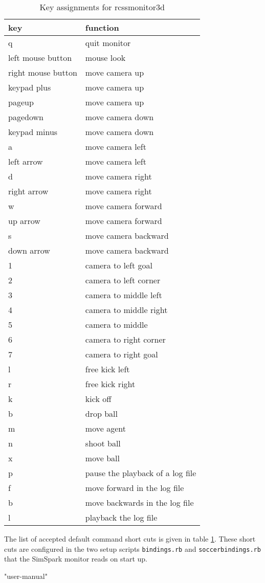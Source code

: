 \begin{table}
\label {table:rcssmonitor3d}
\caption{Key assignments for rcssmonitor3d}
\begin{center}
\begin{tabular}{|l|l|}
{\bf key} & {\bf function} \\
\hline
q & quit monitor \\
\hline
left mouse button & mouse look \\
right mouse button & move camera up \\
keypad plus & move camera up \\
pageup & move camera up \\
pagedown & move camera down \\
keypad minus & move camera down \\
a & move camera left \\
left arrow & move camera left \\
d & move camera right \\
right arrow & move camera right \\
w & move camera forward \\
up arrow & move camera forward \\
s & move camera backward \\
down arrow & move camera backward \\
\hline
1 & camera to left goal \\
2 & camera to left corner \\
3 & camera to middle left \\
4 & camera to middle right \\
5 & camera to middle \\
6 & camera to right corner \\
7 & camera to right goal \\
\hline
l & free kick left \\
r & free kick right \\
k & kick off \\
b & drop ball \\
m & move agent \\
n & shoot ball \\
x & move ball \\
\hline
p & pause the playback of a log file \\
f & move forward in the log file \\
b & move backwards in the log file \\
l & playback the log file \\
\hline
\end{tabular}
\end{center}
\end{table}

The list of accepted default command short cuts is given in table
\ref{table:rcssmonitor3d}. These short cuts are configured in the two setup
scripts \texttt{bindings.rb} and \texttt{soccerbindings.rb} that the
SimSpark monitor reads on start up.

"user-manual" %
